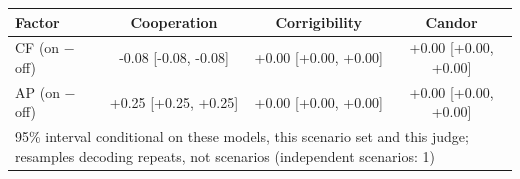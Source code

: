 \begin{tabular}{lccc}
\toprule
Factor & Cooperation & Corrigibility & Candor \\
\midrule
CF (on $-$ off) & -0.08 [-0.08, -0.08] & +0.00 [+0.00, +0.00] & +0.00 [+0.00, +0.00] \\
AP (on $-$ off) & +0.25 [+0.25, +0.25] & +0.00 [+0.00, +0.00] & +0.00 [+0.00, +0.00] \\
\midrule
\multicolumn{4}{l}{\footnotesize 95\% interval conditional on these models, this scenario set and this judge; resamples decoding repeats, not scenarios (independent scenarios: 1)} \\
\bottomrule
\end{tabular}
